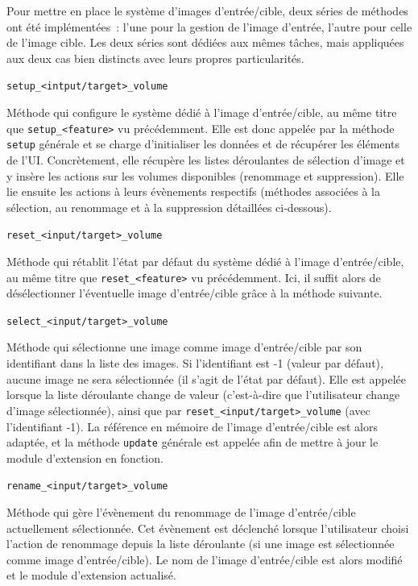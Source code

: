 \documentclass{article}
\newcommand{\method}[1]{\hspace{1in}\texttt{#1}\bigskip}
\begin{document}
{{{            \bigskip

            Pour mettre en place le système d'images d'entrée/cible, deux séries de méthodes ont été implémentées~: l'une pour la gestion de l'image d'entrée, l'autre pour celle de l'image cible. Les deux séries sont dédiées aux mêmes tâches, mais appliquées aux deux cas bien distincts avec leurs propres particularités.

            \bigskip
            \method{setup\_<intput/target>\_volume}

            Méthode qui configure le système dédié à l'image d'entrée/cible, au même titre que \texttt{setup\_<feature>} vu précédemment. Elle est donc appelée par la méthode \texttt{setup} générale et se charge d'initialiser les données et de récupérer les éléments de l'UI. Concrètement, elle récupère les listes déroulantes de sélection d'image et y insère les actions sur les volumes disponibles (renommage et suppression). Elle lie ensuite les actions à leurs évènements respectifs (méthodes associées à la sélection, au renommage et à la suppression détaillées ci-dessous).

            \bigskip
            \method{reset\_<input/target>\_volume}

            Méthode qui rétablit l'état par défaut du système dédié à l'image d'entrée/cible, au même titre que \texttt{reset\_<feature>} vu précédemment. Ici, il suffit alors de désélectionner l'éventuelle image d'entrée/cible grâce à la méthode suivante.

            \bigskip
            \method{select\_<input/target>\_volume}

            Méthode qui sélectionne une image comme image d'entrée/cible par son identifiant dans la liste des images. Si l'identifiant est -1 (valeur par défaut), aucune image ne sera sélectionnée (il s'agit de l'état par défaut). Elle est appelée lorsque la liste déroulante change de valeur (c'est-à-dire que l'utilisateur change d'image sélectionnée), ainsi que par \texttt{reset\_<input/target>\_volume} (avec l'identifiant -1). La référence en mémoire de l'image d'entrée/cible est alors adaptée, et la méthode \texttt{update} générale est appelée afin de mettre à jour le module d'extension en fonction.

            \bigskip
            \method{rename\_<input/target>\_volume}

            Méthode qui gère l'évènement du renommage de l'image d'entrée/cible actuellement sélectionnée. Cet évènement est déclenché lorsque l'utilisateur choisi l'action de renommage depuis la liste déroulante (si une image est sélectionnée comme image d'entrée/cible). Le nom de l'image d'entrée/cible est alors modifié et le module d'extension actualisé.

}}}
\end{document}
